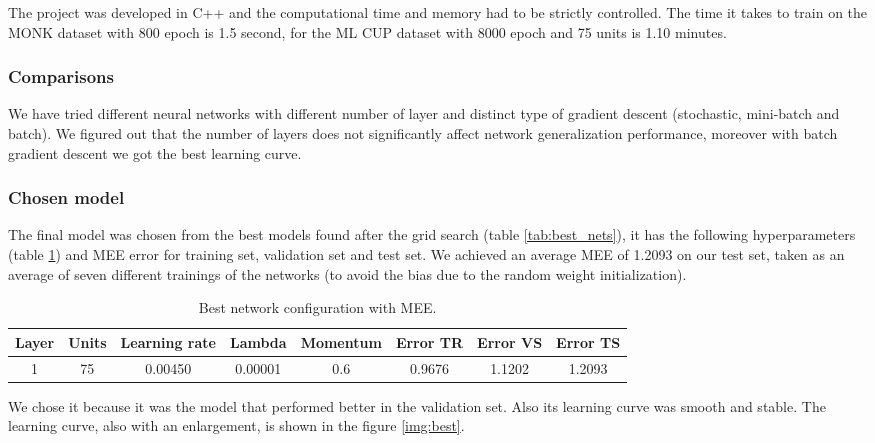The project was developed in C++ and the computational time and memory had to be strictly controlled.
The time it takes to train on the MONK dataset with 800 epoch is 1.5 second, for the ML CUP dataset with 8000 epoch and 75 units is 1.10 minutes.

\subsubsection{Comparisons}
We have tried different neural networks with different number of layer and distinct type of gradient descent (stochastic, mini-batch and batch). We figured out that the number of layers does not significantly affect network generalization performance, moreover with batch gradient descent we got the best learning curve.

\subsubsection{Chosen model}
The final model was chosen from the best models found after the grid search (table \ref{tab:best_nets}), it has the following hyperparameters (table \ref{tab:best_net}) and MEE error for training set, validation set and test set.
We achieved an average MEE of 1.2093 on our test set, taken as an average of seven
different trainings of the networks (to avoid the bias due to the random weight
initialization).
\begin{center} 
\small\addtolength{\tabcolsep}{-3pt}
\begin{table}[h!]
	\centering
	\begin{tabular}{|c|c|c|c|c|c|c|c|}
		\hline
		\textbf{Layer}& \textbf{Units}& \textbf{Learning rate} & \multicolumn{1}{l|}{\textbf{Lambda}} & \textbf{Momentum} & \textbf{Error TR}& \textbf{Error VS}& \textbf{Error TS}\\ \hline
		1 & 75 & 0.00450 & 0.00001 & 0.6  & 0.9676 & 1.1202 & 1.2093  \\
		\hline
	\end{tabular}
	\caption{Best network configuration with MEE.}
	\label{tab:best_net}
\end{table}
\end{center}

We chose it because it was the model that performed better in the validation set. Also its learning curve was smooth and stable.
The learning curve, also with an enlargement, is shown in the figure \ref{img:best}.


